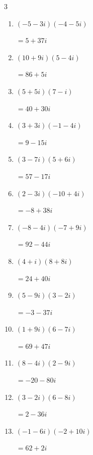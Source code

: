 \begin{multicols}{3}
\begin{enumerate}
        $\displaystyle =18-16i$

  \item $\displaystyle (-5-3i)(-4-5i)$

        $\displaystyle =5+37i$

  \item $\displaystyle (10+9i)(5-4i)$

        $\displaystyle =86+5i$

  \item $\displaystyle (5+5i)(7-i)$

        $\displaystyle =40+30i$

  \item $\displaystyle (3+3i)(-1-4i)$

        $\displaystyle =9-15i$

  \item $\displaystyle (3-7i)(5+6i)$

        $\displaystyle =57-17i$

  \item $\displaystyle (2-3i)(-10+4i)$

        $\displaystyle =-8+38i$

  \item $\displaystyle (-8-4i)(-7+9i)$

        $\displaystyle =92-44i$

  \item $\displaystyle (4+i)(8+8i)$

        $\displaystyle =24+40i$

  \item $\displaystyle (5-9i)(3-2i)$

        $\displaystyle =-3-37i$

  \item $\displaystyle (1+9i)(6-7i)$

        $\displaystyle =69+47i$

\columnbreak %

  \item $\displaystyle (8-4i)(2-9i)$

        $\displaystyle =-20-80i$

  \item $\displaystyle (3-2i)(6-8i)$

        $\displaystyle =2-36i$

  \item $\displaystyle (-1-6i)(-2+10i)$

        $\displaystyle =62+2i$


\end{enumerate}
\end{multicols}
